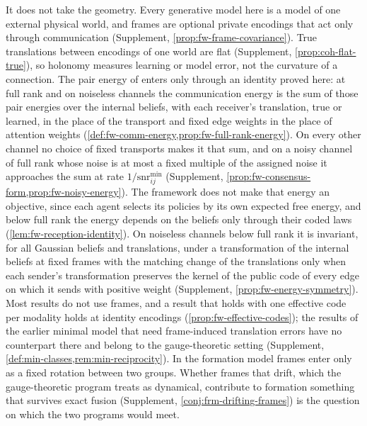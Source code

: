 It does not take the geometry. Every generative model here is a model of one external physical world, and frames are optional private encodings that act only through communication (Supplement, \cref{prop:fw-frame-covariance}). True translations between encodings of one world are flat (Supplement, \cref{prop:coh-flat-true}), so holonomy measures learning or model error, not the curvature of a connection. The pair energy of \citet{dennis2026participatory} enters only through an identity proved here: at full rank and on noiseless channels the communication energy is the sum of those pair energies over the internal beliefs, with each receiver's translation, true or learned, in the place of the transport and fixed edge weights in the place of attention weights (\cref{def:fw-comm-energy,prop:fw-full-rank-energy}). On every other channel no choice of fixed transports makes it that sum, and on a noisy channel of full rank whose noise is at most a fixed multiple of the assigned noise it approaches the sum at rate $1/\mathrm{snr}^{\min}_{ij}$ (Supplement, \cref{prop:fw-consensus-form,prop:fw-noisy-energy}). The framework does not make that energy an objective, since each agent selects its policies by its own expected free energy, and below full rank the energy depends on the beliefs only through their coded laws (\cref{lem:fw-reception-identity}). On noiseless channels below full rank it is invariant, for all Gaussian beliefs and translations, under a transformation of the internal beliefs at fixed frames with the matching change of the translations only when each sender's transformation preserves the kernel of the public code of every edge on which it sends with positive weight (Supplement, \cref{prop:fw-energy-symmetry}). Most results do not use frames, and a result that holds with one effective code per modality holds at identity encodings (\cref{prop:fw-effective-codes}); the results of the earlier minimal model that need frame-induced translation errors have no counterpart there and belong to the gauge-theoretic setting (Supplement, \cref{def:min-classes,rem:min-reciprocity}). In the formation model frames enter only as a fixed rotation between two groups. Whether frames that drift, which the gauge-theoretic program treats as dynamical, contribute to formation something that survives exact fusion (Supplement, \cref{conj:frm-drifting-frames}) is the question on which the two programs would meet.
